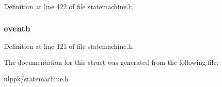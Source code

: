 Definition at line 122 of file statemachine.\-h.

\hypertarget{struct__event__struct_a59bd332d34b2d67050865ea52c88bc47}{
\subsubsection[{eventh}]{ eventh}}\label{struct__event__struct_a59bd332d34b2d67050865ea52c88bc47}


Definition at line 121 of file statemachine.\-h.



The documentation for this struct was generated from the following file\-:\begin{DoxyCompactItemize}
\item 
ulppk/\hyperlink{statemachine_8h}{statemachine.\-h}\end{DoxyCompactItemize}
